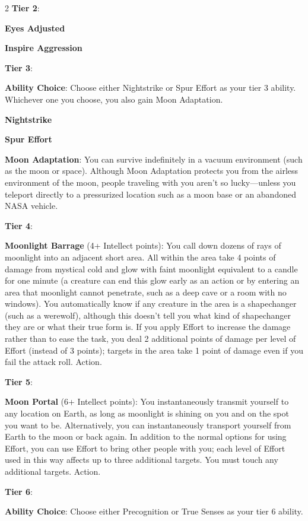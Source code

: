 \begin{multicols}{2}
\textbf{Tier 2}:

\textbf{Eyes Adjusted} 

\textbf{Inspire Aggression} 

\textbf{Tier 3}:

\textbf{Ability Choice}: Choose either Nightstrike or Spur Effort as your tier 3 ability. Whichever one you choose, you also gain Moon Adaptation.

\textbf{Nightstrike}
 
\textbf{Spur Effort}
 
\textbf{Moon Adaptation}: You can survive indefinitely in a vacuum environment (such as the moon or space). Although Moon Adaptation protects you from the airless environment of the moon, people traveling with you aren’t so lucky—unless you teleport directly to a pressurized location such as a moon base or an abandoned NASA vehicle.

\textbf{Tier 4}:

\textbf{Moonlight Barrage} (4+ Intellect points): You call down dozens of rays of moonlight into an adjacent short area. All within the area take 4 points of damage from mystical cold and glow with faint moonlight equivalent to a candle for one minute (a creature can end this glow early as an action or by entering an area that moonlight cannot penetrate, such as a deep cave or a room with no windows). You automatically know if any creature in the area is a shapechanger (such as a
werewolf), although this doesn’t tell you what kind of shapechanger they are or what their true form is. If you apply Effort to increase the damage rather than to ease the task, you deal 2 additional points of damage per level of Effort (instead of 3 points); targets in the area take 1 point of damage even if you fail the attack roll. Action.

\textbf{Tier 5}:

\textbf{Moon Portal} (6+ Intellect points): You instantaneously transmit yourself to any location on Earth, as long as moonlight is shining on you and on the spot you want to be. Alternatively, you can instantaneously transport yourself from Earth to the moon or back again. In addition to the normal options for using Effort, you can use Effort to bring other people with you; each level of Effort used in this way affects up to three additional targets. You must touch any additional targets. Action.

\textbf{Tier 6}:

\textbf{Ability Choice}: Choose either Precognition or True Senses as your tier 6 ability. 


\end{multicols}
